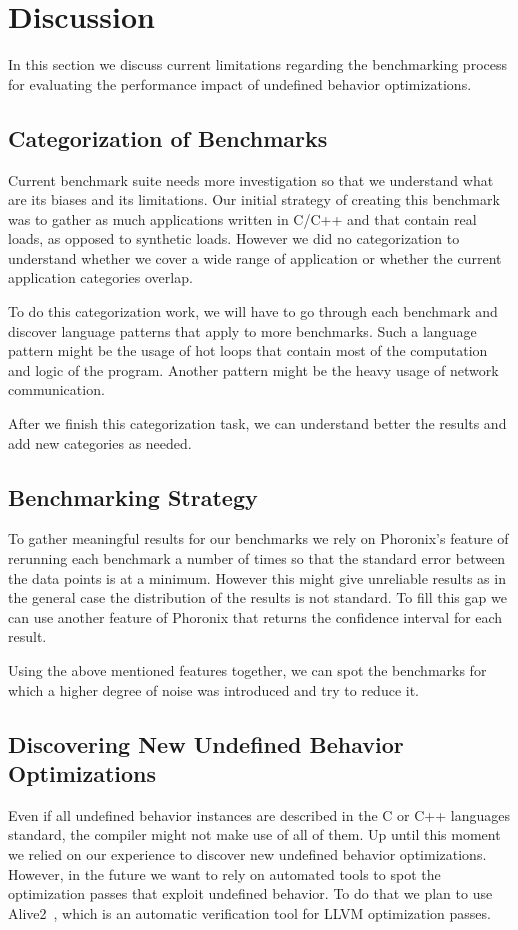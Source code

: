\section{Discussion} \label{sec:discussion}

In this section we discuss current limitations regarding the benchmarking
process for evaluating the performance impact of undefined behavior
optimizations.

\subsection{Categorization of Benchmarks}

Current benchmark suite needs more investigation so that we understand what are
its biases and its limitations. Our initial strategy of creating this benchmark
was to gather as much applications written in C/C++ and that contain real loads,
as opposed to synthetic loads. However we did no categorization to understand
whether we cover a wide range of application or whether the current application
categories overlap.

To do this categorization work, we will have to go through each benchmark and
discover language patterns that apply to more benchmarks. Such a language
pattern might be the usage of hot loops that contain most of the computation and
logic of the program. Another pattern might be the heavy usage of network
communication.

After we finish this categorization task, we can understand better the results
and add new categories as needed.

\subsection{Benchmarking Strategy}

To gather meaningful results for our benchmarks we rely on Phoronix's feature of
rerunning each benchmark a number of times so that the standard error between
the data points is at a minimum. However this might give unreliable results as
in the general case the distribution of the results is not standard. To fill
this gap we can use another feature of Phoronix that returns the confidence
interval for each result.

Using the above mentioned features together, we can spot the benchmarks for
which a higher degree of noise was introduced and try to reduce it. 

\subsection{Discovering New Undefined Behavior Optimizations}

Even if all undefined behavior instances are described in the C or C++ languages
standard, the compiler might not make use of all of them. Up until this moment
we relied on our experience to discover new undefined behavior optimizations.
However, in the future we want to rely on automated tools to spot the
optimization passes that exploit undefined behavior. To do that we plan to use
Alive2~\cite{lopes2021alive2}, which is an automatic verification tool for LLVM
optimization passes.
